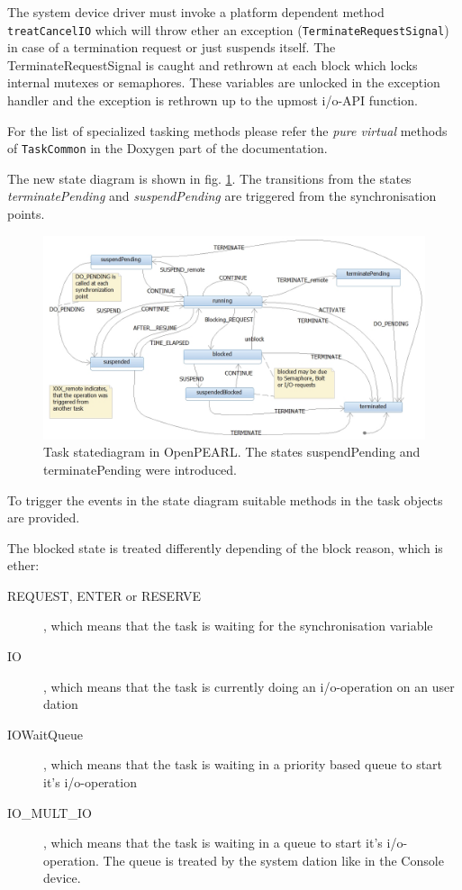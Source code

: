 \begin{description}
The system device driver must invoke a platform dependent method
\verb|treatCancelIO| which will throw ether an exception
(\verb|TerminateRequestSignal|) in case of a termination request
 or just suspends itself.
The TerminateRequestSignal is caught and rethrown at each block which 
locks internal mutexes or semaphores. These variables are unlocked in
the exception handler and the exception is rethrown up to the upmost i/o-API
function.

For the list of specialized tasking methods please refer the
{\em pure virtual} methods of \verb|TaskCommon| in the Doxygen
part of the documentation.

The new state diagram is shown in 
fig. \ref{taskStatesOpenPEARL}.
The transitions from the  states {\em terminatePending} and 
{\em suspendPending}  are triggered from the synchronisation points.

\begin{figure}[bpht]
\includegraphics[width=14cm]{taskStatesOpenPEARL.jpg}
\caption{Task statediagram in OpenPEARL.
The states suspendPending and terminatePending were introduced.}
\label{taskStatesOpenPEARL}
\end{figure}
To trigger the events in the state diagram suitable methods in the task 
objects are provided. 

The blocked state is treated differently depending of the block reason, which
is ether:
\begin{description}
\item[REQUEST, ENTER or RESERVE], which means that the task is waiting for 
   the synchronisation variable
\item[IO], which means that the task is currently doing an i/o-operation
   on an user dation
\item[IOWaitQueue], which means that the task is waiting in a priority based
   queue to start it's i/o-operation
\item[IO\_MULT\_IO], which means that the task is waiting in a 
   queue to start it's i/o-operation. The queue is treated by the 
   system dation like in the Console device.
\end{description}


\end{description}

